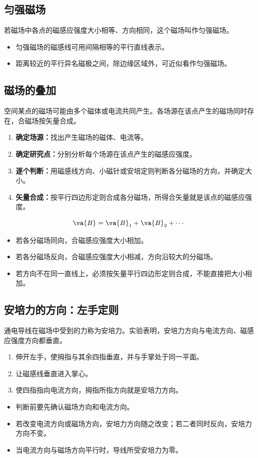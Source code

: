 \documentclass[a4paper,12pt,twoside]{article}
\begin{document}
\subsection{匀强磁场}
若磁场中各点的磁感应强度大小相等、方向相同，这个磁场叫作匀强磁场。
\begin{itemize}
    \item 匀强磁场的磁感线可用间隔相等的平行直线表示。
    \item 距离较近的平行异名磁极之间，除边缘区域外，可近似看作匀强磁场。
\end{itemize}


\subsection{磁场的叠加}
空间某点的磁场可能由多个磁体或电流共同产生。各场源在该点产生的磁场同时存在，合磁场按矢量合成。
\begin{enumerate}
    \item \textbf{确定场源：}找出产生磁场的磁体、电流等。
    \item \textbf{确定研究点：}分别分析每个场源在该点产生的磁感应强度。
    \item \textbf{逐个判断：}用磁感线方向、小磁针或安培定则判断各分磁场的方向，并确定大小。
    \item \textbf{矢量合成：}按平行四边形定则合成各分磁场，所得合矢量就是该点的磁感应强度。
\end{enumerate}
\[
    \va{B}=\va{B}_1+\va{B}_2+\cdots
\]
\begin{itemize}
    \item 若各分磁场同向，合磁感应强度大小相加。
    \item 若各分磁场反向，合磁感应强度大小相减，方向沿较大的分磁场。
    \item 若方向不在同一直线上，必须按矢量平行四边形定则合成，不能直接把大小相加。
\end{itemize}


\subsection{安培力的方向：左手定则}
通电导线在磁场中受到的力称为安培力。实验表明，安培力方向与电流方向、磁感应强度方向都垂直。
\begin{enumerate}
    \item 伸开左手，使拇指与其余四指垂直，并与手掌处于同一平面。
    \item 让磁感线垂直进入掌心。
    \item 使四指指向电流方向，拇指所指方向就是安培力方向。
\end{enumerate}
\begin{itemize}
    \item 判断前要先确认磁场方向和电流方向。
    \item 若改变电流方向或磁场方向，安培力方向随之改变；若二者同时反向，安培力方向不变。
    \item 当电流方向与磁场方向平行时，导线所受安培力为零。
\end{itemize}
\end{document}
